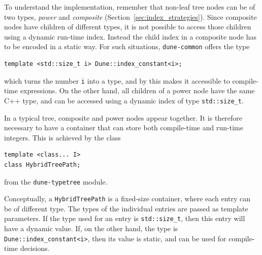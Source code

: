 \documentclass[a4paper,10pt,headings=normal,bibliography=totoc]{scrartcl}
\newcommand{\cpp}[1]{\lstinline[basicstyle=\ttfamily]!#1!}
\newcommand{\dunemodule}[1]{\texttt{#1}}
\begin{document}
To understand the implementation,
remember that non-leaf tree nodes can be of two types, \emph{power} and
\emph{composite} (Section~\ref{sec:index_strategies}).
Since composite nodes have children of different
types, it is not possible to access those children using a dynamic run-time
index. Instead the child index in a composite node has to be encoded in a static
way.  For such situations, \dunemodule{dune-common} offers the type
\begin{lstlisting}[style=Interface]
template <std::size_t i> Dune::index_constant<i>;
\end{lstlisting}
which turns the number \cpp{i} into a type, and by this makes it accessible
to compile-time expressions.
On the other hand, all children of a power node have
the same C++ type, and can be accessed using a dynamic index of type \cpp{std::size_t}.

In a typical tree, composite and power nodes appear together.  It is therefore
necessary to have a container that can store both compile-time and run-time integers.
This is achieved by the class
%
\begin{lstlisting}[style=Interface]
template <class... I>
class HybridTreePath;
\end{lstlisting}
%
from the \dunemodule{dune-typetree} module.

Conceptually, a \cpp{HybridTreePath} is a fixed-size container, where each entry
can be of different type. The types of the individual entries
are passed as template parameters. If the type used for an entry is
\cpp{std::size_t}, then this entry will have a dynamic value.
If, on the other hand, the type is \cpp{Dune::index_constant<i>}, then its value is static,
and can be used for compile-time decisions.
\end{document}
